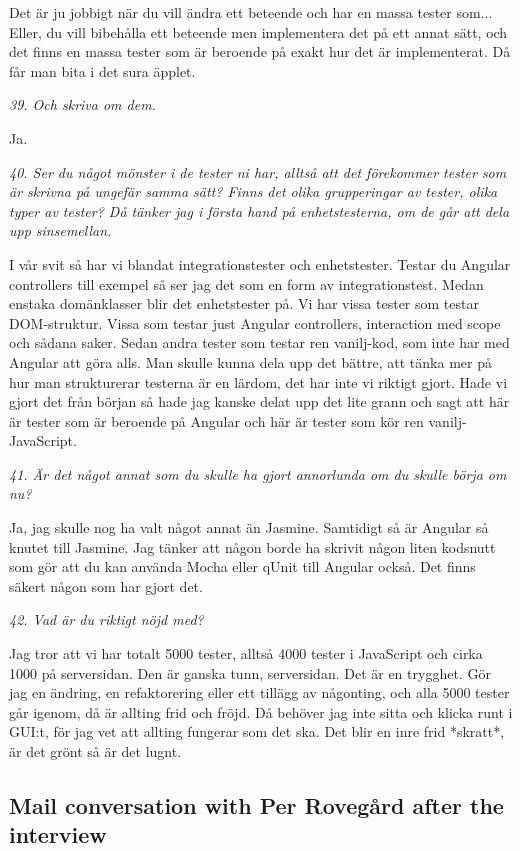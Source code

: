 \documentclass[11pt]{article}
\begin{document}
Det är ju jobbigt när du vill ändra ett beteende och har en massa tester som... Eller, du vill bibehålla ett beteende men implementera det på ett annat sätt, och det finns en massa tester som är beroende på exakt hur det är implementerat. Då får man bita i det sura äpplet.

\emph{39. Och skriva om dem.}

Ja.

\emph{40. Ser du något mönster i de tester ni har, alltså att det förekommer tester som är skrivna på ungefär samma sätt? Finns det olika grupperingar av tester, olika typer av tester? Då tänker jag i första hand på enhetstesterna, om de går att dela upp sinsemellan.}

I vår svit så har vi blandat integrationstester och enhetstester. Testar du Angular controllers till exempel så ser jag det som en form av integrationstest. Medan enstaka domänklasser blir det enhetstester på. Vi har vissa tester som testar DOM-struktur. Vissa som testar just Angular controllers, interaction med scope och sådana saker. Sedan andra tester som testar ren vanilj-kod, som inte har med Angular att göra alls. Man skulle kunna dela upp det bättre, att tänka mer på hur man strukturerar testerna är en lärdom, det har inte vi riktigt gjort. Hade vi gjort det från början så hade jag kanske delat upp det lite grann och sagt att här är tester som är beroende på Angular och här är tester som kör ren vanilj-JavaScript.

\emph{41. Är det något annat som du skulle ha gjort annorlunda om du skulle börja om nu?}

Ja, jag skulle nog ha valt något annat än Jasmine. Samtidigt så är Angular så knutet till Jasmine. Jag tänker att någon borde ha skrivit någon liten kodsnutt som gör att du kan använda Mocha eller qUnit till Angular också. Det finns säkert någon som har gjort det.

\emph{42. Vad är du riktigt nöjd med?}

Jag tror att vi har totalt 5000 tester, alltså 4000 tester i JavaScript och cirka 1000 på serversidan. Den är ganska tunn, serversidan. Det är en trygghet. Gör jag en ändring, en refaktorering eller ett tillägg av någonting, och alla 5000 tester går igenom, då är allting frid och fröjd. Då behöver jag inte sitta och klicka runt i GUI:t, för jag vet att allting fungerar som det ska. Det blir en inre frid *skratt*, är det grönt så är det lugnt.


\subsection*{Mail conversation with Per Rovegård after the interview}
\end{document}

